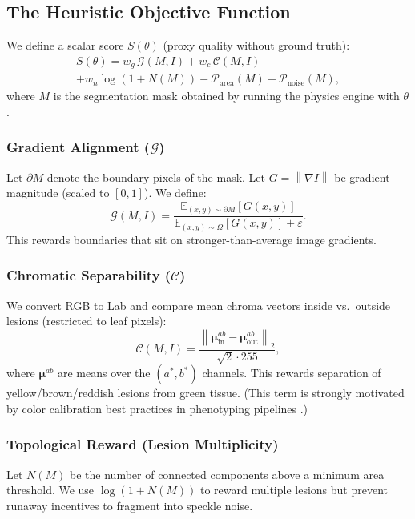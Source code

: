 \documentclass[11pt,a4paper]{article}
\newcommand{\E}{\mathbb{E}}
\newcommand{\grad}{\nabla}
\newcommand{\norm}[1]{\left\lVert #1 \right\rVert}
\begin{document}
\subsection{The Heuristic Objective Function}
\label{sec:objective}
We define a scalar score $S(\theta)$ (proxy quality without ground truth):
\begin{multline}
S(\theta) = w_g \,\mathcal{G}(M,I) + w_c \,\mathcal{C}(M,I) \\
            + w_n \log(1{+}N(M))
            - \mathcal{P}_{\mathrm{area}}(M) - \mathcal{P}_{\mathrm{noise}}(M),
\label{eq:objective}
\end{multline}
where $M$ is the segmentation mask obtained by running the physics engine with $\theta$.

\subsubsection{Gradient Alignment ($\mathcal{G}$)}
Let $\partial M$ denote the boundary pixels of the mask. Let $G=\norm{\grad I}$ be gradient magnitude (scaled to $[0,1]$). We define:
\begin{equation}
\mathcal{G}(M,I) = \frac{\E_{(x,y)\sim \partial M}[G(x,y)]}{\E_{(x,y)\sim \Omega}[G(x,y)] + \varepsilon}.
\end{equation}
This rewards boundaries that sit on stronger-than-average image gradients.

\subsubsection{Chromatic Separability ($\mathcal{C}$)}
We convert RGB to Lab and compare mean chroma vectors inside vs.\ outside lesions (restricted to leaf pixels):
\begin{equation}
\mathcal{C}(M,I) = \frac{\norm{\bm{\mu}_{\mathrm{in}}^{ab}-\bm{\mu}_{\mathrm{out}}^{ab}}_2}{\sqrt{2}\cdot 255},
\end{equation}
where $\bm{\mu}^{ab}$ are means over the $(a^\ast,b^\ast)$ channels. This rewards separation of yellow/brown/reddish lesions from green tissue. (This term is strongly motivated by color calibration best practices in phenotyping pipelines \citep{berry2018color,plantcv2025}.)

\subsubsection{Topological Reward (Lesion Multiplicity)}
Let $N(M)$ be the number of connected components above a minimum area threshold. We use $\log(1+N(M))$ to reward multiple lesions but prevent runaway incentives to fragment into speckle noise.
\end{document}
